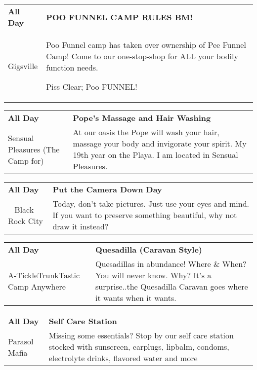 \begin{tabular}{ p{1in} p{2.2in} }
    \textbf{All Day} & \textbf{POO FUNNEL CAMP RULES BM!} \\
    Gigsville \newline  & Poo Funnel camp has taken over ownership of Pee Funnel Camp! Come to our one-stop-shop for ALL your bodily function needs.

Piss Clear;
Poo FUNNEL! \\
    \hline 
\end{tabular}
    
\begin{tabular}{ p{1in} p{2.2in} }
    \textbf{All Day} & \textbf{Pope's Massage and Hair Washing} \\
    Sensual Pleasures (The Camp for) \newline  & At our oasis the Pope will wash your hair, massage your body and invigorate your spirit. My 19th year on the Playa. I am located in Sensual Pleasures. \\
    \hline 
\end{tabular}
    
\begin{tabular}{ p{1in} p{2.2in} }
    \textbf{All Day} & \textbf{Put the Camera Down Day} \\
    ~ \newline Black Rock City & Today, don't take pictures. Just use your eyes and mind. If you want to preserve something beautiful, why not draw it instead? \\
    \hline 
\end{tabular}
    
\begin{tabular}{ p{1in} p{2.2in} }
    \textbf{All Day} & \textbf{Quesadilla (Caravan Style)} \\
    A-TickleTrunkTastic Camp \newline Anywhere & Quesadillas in abundance! Where \& When? You will never know. Why? It's a surprise..the Quesadilla Caravan goes where it wants when it wants. \\
    \hline 
\end{tabular}
    
\begin{tabular}{ p{1in} p{2.2in} }
    \textbf{All Day} & \textbf{Self Care Station} \\
    Parasol Mafia \newline  & Missing some essentials? Stop by our self care station stocked with sunscreen, earplugs, lipbalm, condoms, electrolyte drinks, flavored water and more \\
    \hline 
\end{tabular}
    
